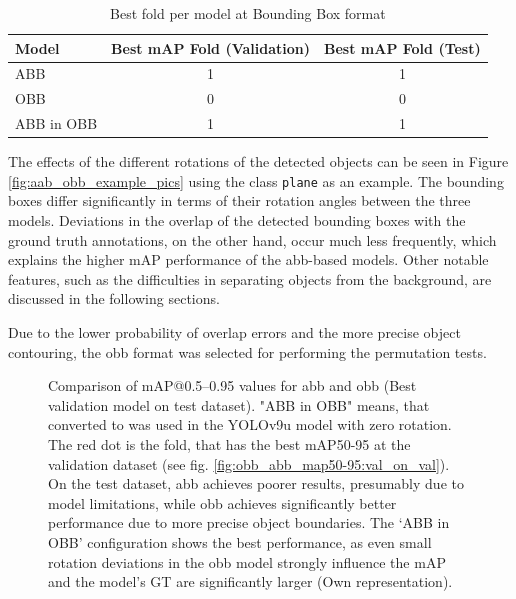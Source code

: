 \begin{table}[h]
\centering
\begin{tabular}{l c c}
\hline
\textbf{Model} & \textbf{Best mAP Fold (Validation)} & \textbf{Best mAP Fold (Test)} \\ 
\hline
ABB &  1 & 1 \\
OBB &  0 & 0 \\
ABB in OBB &  1 & 1 \\
\hline
\end{tabular}
\caption{Best fold per model at Bounding Box format}
\label{tab:best_folds_area}
\end{table}


The effects of the different rotations of the detected objects can be seen in Figure \ref{fig:aab_obb_example_pics} using the class \texttt{plane} as an example. The bounding boxes differ significantly in terms of their rotation angles between the three models. Deviations in the overlap of the detected bounding boxes with the ground truth annotations, on the other hand, occur much less frequently, which explains the higher \acrshort{mAP} performance of the \acrshort{abb}-based models. Other notable features, such as the difficulties in separating objects from the background, are discussed in the following sections.

Due to the lower probability of overlap errors and the more precise object contouring, the \acrshort{obb} format was selected for performing the permutation tests.


\begin{figure}[htbp]
    \centering
    
    \caption[Comparison of \acrshort{mAP}@0.5--0.95 values for \acrshort{abb} and \acrshort{obb} (Best validation model on test dataset)]{Comparison of \acrshort{mAP}@0.5--0.95 values for \acrshort{abb} and \acrshort{obb} (Best validation model on test dataset). "ABB in OBB" means, that  converted to  was used in the \acrshort{YOLO}v9u model with zero rotation. The red dot is the fold, that has the best \acrshort{mAP}50-95 at the validation dataset (see fig. \ref{fig:obb_abb_map50-95:val_on_val}).  On the test dataset, \acrshort{abb} achieves poorer results, presumably due to model limitations, while \acrshort{obb} achieves significantly better performance due to more precise object boundaries. The ‘ABB in OBB’ configuration shows the best performance, as even small rotation deviations in the \acrshort{obb} model strongly influence the \acrshort{mAP} and the model's \acrshort{GT}  are significantly larger (Own representation). }
    \label{fig:obb_abb_map50-95:val_on_test}
\end{figure}


